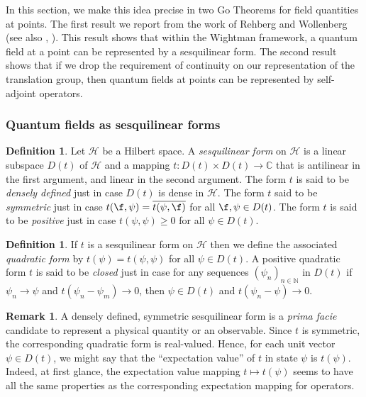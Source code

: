 \documentclass[11pt]{article}
\theoremstyle{definition}
\theoremstyle{definition}
\newtheorem{defn}[thm]{Definition}
\newtheorem{note}[thm]{Remark}
\theoremstyle{remark}
\def\2#1{{\mathcal #1}}
\def\7#1{{\mathbb #1}}
\begin{document}
In this section, we make this idea precise in two Go Theorems for
field quantities at points.  The first result we report from the work
of Rehberg and Wollenberg \cite{wollenberg86a,wollenberg86b} (see also
\cite{fred81}, \cite{bostelmann,bostelmann-b}).  This result shows
that within the Wightman framework, a quantum field at a point can be
represented by a sesquilinear form.  The second result shows that if
we drop the requirement of continuity on our representation of the
translation group, then quantum fields at points can be represented by
self-adjoint operators.

\subsubsection{Quantum fields as sesquilinear forms}

\begin{defn} Let $\2H$ be a Hilbert space.  A \emph{sesquilinear form}
  on $\2H$ is a linear subspace $D(t)$ of $\2H$ and a mapping $t:D(t)
  \times D(t) \to \7C$ that is antilinear in the first argument, and
  linear in the second argument.  The form $t$ is said to be
  \emph{densely defined} just in case $D(t)$ is dense in $\2H$.  The
  form $t$ said to be \emph{symmetric} just in case $t(\f ,\psi
  )=\overline{t(\psi ,\f )}$ for all $\f ,\psi \in D(t)$.  The form
  $t$ is said to be \emph{positive} just in case $t(\psi ,\psi )\geq
  0$ for all $\psi \in D(t)$.
\end{defn}

\begin{defn} If $t$ is a sesquilinear form on $\2H$ then we define the
  associated \emph{quadratic form} by $t(\psi )=t(\psi ,\psi )$ for
  all $\psi \in D(t)$.  A positive quadratic form $t$ is said to be
  \emph{closed} just in case for any sequences $(\psi _n)_{n\in \7N }$
  in $D(t)$ if $\psi _n\to \psi$ and $t(\psi _n-\psi _m)\to 0$, then
  $\psi \in D(t)$ and $t(\psi _n-\psi )\to 0$.  \end{defn}

\begin{note} A densely defined, symmetric sesquilinear form is a
  \emph{prima facie} candidate to represent a physical quantity or an
  observable.  Since $t$ is symmetric, the corresponding quadratic
  form is real-valued.  Hence, for each unit vector $\psi \in D(t)$,
  we might say that the ``expectation value'' of $t$ in state $\psi$
  is $t(\psi )$.  Indeed, at first glance, the expectation value
  mapping $t\mapsto t(\psi )$ seems to have all the same properties as
  the corresponding expectation mapping for operators.
\end{note}
\end{document}

